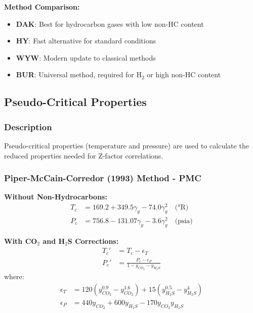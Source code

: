 \documentclass[11pt,a4paper]{article}
\begin{document}
\textbf{Method Comparison:}
\begin{itemize}
\item \textbf{DAK}: Best for hydrocarbon gases with low non-HC content
\item \textbf{HY}: Fast alternative for standard conditions
\item \textbf{WYW}: Modern update to classical methods
\item \textbf{BUR}: Universal method, required for H$_2$ or high non-HC content
\end{itemize}

\subsection{Pseudo-Critical Properties}

\subsubsection{Description}
Pseudo-critical properties (temperature and pressure) are used to calculate the reduced properties needed for Z-factor correlations.

\subsubsection{Piper-McCain-Corredor (1993) Method - PMC}

\begin{tcolorbox}[colback=formulabox,colframe=black!75]
\textbf{Without Non-Hydrocarbons:}
\begin{align}
T_c &= 169.2 + 349.5 \gamma_g - 74.0 \gamma_g^2 \quad \text{(°R)} \\
P_c &= 756.8 - 131.07 \gamma_g - 3.6 \gamma_g^2 \quad \text{(psia)}
\end{align}

\textbf{With CO$_2$ and H$_2$S Corrections:}
\begin{align}
T_c' &= T_c - \epsilon_T \\
P_c' &= \frac{P_c - \epsilon_P}{1 - y_{CO_2} - y_{H_2S}}
\end{align}
where:
\begin{align}
\epsilon_T &= 120(y_{CO_2}^{0.9} - y_{CO_2}^{1.6}) + 15(y_{H_2S}^{0.5} - y_{H_2S}^4) \\
\epsilon_P &= 440 y_{CO_2} + 600 y_{H_2S} - 170 y_{CO_2} y_{H_2S}
\end{align}
\end{tcolorbox}
\end{document}
